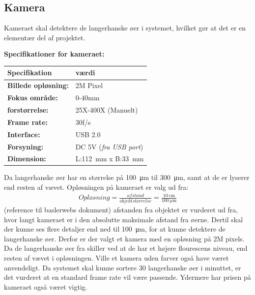\newpage
\subsection{Kamera}
Kameraet skal detektere de langerhanske øer i systemet, hvilket gør at det er en elementær del af projektet.

\textbf{Specifikationer for kameraet:} 
\begin{center}
		\begin{longtable}{ | m{6.5cm} | m{6.5cm}| } 
			\hline
			\textbf{Specifikation} &\textbf{værdi} \\ 
			\hline
			\textbf{Billede opløsning:} & 2M Pixel \\ 
			\hline
			\textbf{Fokus område:} & 0-40mm  \\ 
			\hline
			\textbf{forstørrelse:} & 25X-400X (Manuelt)  \\ 
			\hline
			\textbf{Frame rate:} & 30f/s  \\ 
			\hline
			\textbf{Interface:} & USB 2.0  \\ 
			\hline
			\textbf{Forsyning:} & DC 5V (\textit{fra USB port})  \\ 
			\hline
			\textbf{Dimension:} & L:\SI{112}{\milli\metre} x B:\SI{33}{\milli\metre}  \\ 
			\hline			
		\end{longtable}
		
	\end{center}
Da langerhanske øer har en størrelse på \SI{100}{\micro\metre} til \SI{300}{\micro\metre}, samt at de er lyserer end resten af vævet. Opløsningen på kameraet er valg ud fra:
\begin{align}
Opløsning = \frac{afstand}{objektstørrelse} = \frac{\SI{10}{\centi\metre}}{\SI{100}{\micro\metre}}
\end{align} (reference til baslerwebs dokument)
afstanden fra objektet er vurderet ud fra, hvor langt kameraet er i den absolutte maksimale afstand fra øerne. Dertil skal der kunne ses flere detaljer end ned til \SI{100}{\micro\metre}, for at kunne detektere de langerhanske øer. Derfor er der valgt et kamera med en opløsning på 2M pixels. Da de langerhanske øer fra skiller ved at de har et højere flourescens niveau, end resten af vævet i opløsningen. Ville et kamera uden farver også have været anvendeligt. Da systemet skal kunne sortere 30 langerhanske øer i minuttet, er det vurderet at en standard frame rate vil være passende. Ydermere har prisen på kameraet også været vigtig.


